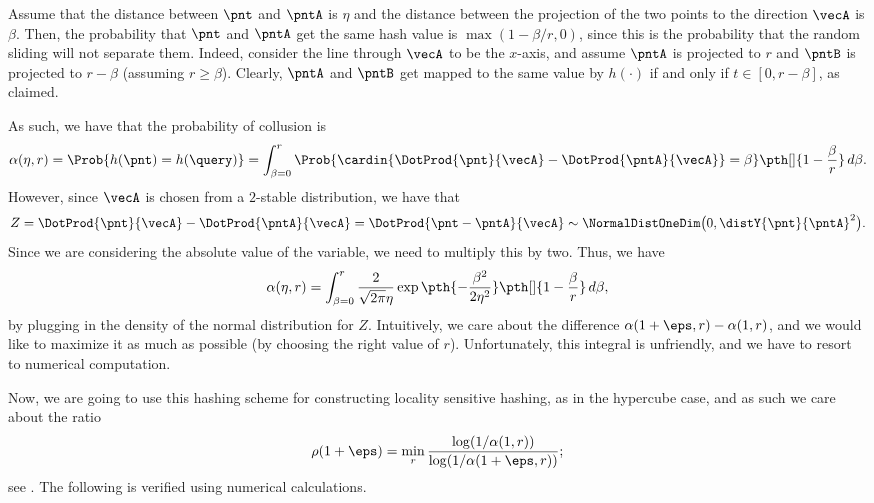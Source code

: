 Assume that the distance between $\pnt$ and $\pntA$ is $\eta$ and the
distance between the projection of the two points to the direction
$\vecA$ is $\beta$. Then, the probability that $\pnt$ and $\pntA$ get
the same hash value is $\max( 1-\beta/r, 0 )$, since this is the
probability that the random sliding will not separate them.  Indeed,
consider the line through $\vecA$ to be the $x$-axis, and assume
$\pntA$ is projected to $r$ and $\pntB$ is projected to $r- \beta$
(assuming $r \geq \beta$).  Clearly, $\pntA$ and $\pntB$ get mapped to
the same value by $h(\cdot)$ if and only if $t \in [0,r-\beta]$, as
claimed.

As such, we have that the probability of collusion is
\begin{align*}
  \alpha(\eta, r)%
  =%
  \Prob{ \bigl. h(\pnt) = h(\query) } %
  =%
  \int_{\beta=0}^{r}%
  \Prob{\bigl. \cardin{ \DotProd{\pnt}{\vecA} -
  \DotProd{\pntA}{\vecA}} = \beta} \pth[]{ 1-
  \frac{\beta}{r}} \, d\beta.
\end{align*}
However, since $\vecA$ is chosen from a $2$-stable distribution, we
have that
\begin{equation*}
    Z%
    =%
    \DotProd{\pnt}{\vecA} - \DotProd{\pntA}{\vecA}%
    =%
    \DotProd{\pnt - \pntA}{\vecA}%
    \sim%
    \NormalDistOneDim\bigl( 0, \distY{\pnt}{\pntA}^2 \bigr).
\end{equation*}
 Since we are considering the absolute
value of the variable, we need to multiply this by two.  Thus, we have
\begin{align*}
    \alpha(\eta, r)%
    =%
    \int_{\beta=0}^{r} \frac{2}{\sqrt{2 \pi} \eta} \exp\pth{ -
       \frac{\beta^2}{2\eta^2}}\pth[]{ 1 - \frac{\beta}{r}} \, d\beta,
\end{align*}
by plugging in the density of the normal distribution for $Z$.
Intuitively, we care about the difference $\alpha( 1+\eps,r )
-\alpha(1,r)$, and we would like to maximize it as much as possible
(by choosing the right value of $r$). Unfortunately, this integral is
unfriendly, and we have to resort to numerical computation.
%


Now, we are going to use this hashing scheme for constructing locality
sensitive hashing, as in the hypercube case, and as such we care about
the ratio
\begin{align*}
    \rho(1+\eps)%
    =%
    \min_{r} \frac{\log (1/\alpha(1, r))}{\log (1/\alpha(1+\eps,r))};
\end{align*}
see .  The following is verified using numerical
calculations.

